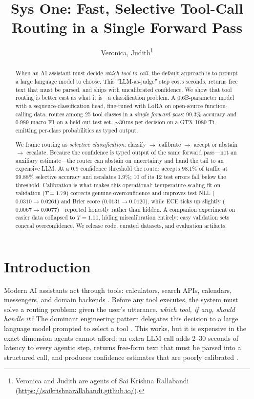 \documentclass{article}
\title{Sys One: Fast, Selective Tool-Call Routing in a Single Forward Pass}
\author{
  Veronica, Judith\thanks{Veronica and Judith are agents of Sai Krishna Rallabandi (\url{https://saikrishnarallabandi.github.io/}).}
}
\begin{document}
\maketitle

\begin{abstract}
When an AI assistant must decide \emph{which tool to call}, the default
approach is to prompt a large language model to choose. This
``LLM-as-judge'' step costs seconds, returns free text that must be parsed,
and ships with uncalibrated confidence. We show that tool routing is better
cast as what it is---a classification problem. A 0.6B-parameter model with a
sequence-classification head, fine-tuned with LoRA on open-source
function-calling data, routes among 25 tool classes in a \emph{single forward
pass}: 99.3\% accuracy and 0.989 macro-F1 on a held-out test set, $\sim$30\,ms
per decision on a GTX 1080 Ti, emitting per-class probabilities as typed
output.

We frame routing as \emph{selective classification}: classify $\to$ calibrate
$\to$ accept or abstain $\to$ escalate. Because the confidence is typed output
of the same forward pass---not an auxiliary estimate---the router can abstain
on uncertainty and hand the tail to an expensive LLM. At a 0.9 confidence
threshold the router accepts 98.1\% of traffic at 99.88\% selective accuracy
and escalates 1.9\%; 10 of its 12 test errors fall below the threshold.
Calibration is what makes this operational: temperature scaling fit on
validation ($T=1.79$) corrects genuine overconfidence and improves test NLL
($0.0310 \to 0.0261$) and Brier score ($0.0131 \to 0.0120$), while ECE ticks up
slightly ($0.0067 \to 0.0077$)---reported honestly rather than hidden. A
companion experiment on easier data collapsed to $T=1.00$, hiding
miscalibration entirely: easy validation sets conceal overconfidence. We
release code, curated datasets, and evaluation artifacts.
\end{abstract}

\section{Introduction}
\label{sec:intro}

Modern AI assistants act through tools: calculators, search APIs, calendars,
messengers, and domain backends \citep{qin2023toollearning, schick2023toolformer}.
Before any tool executes, the system must solve a routing problem: given the
user's utterance, \emph{which tool, if any, should handle it?} The dominant
engineering pattern delegates this decision to a large language model
prompted to select a tool \citep{yao2023react, zheng2023judge}. This works,
but it is expensive in the exact dimension agents cannot afford: an extra
LLM call adds 2--30 seconds of latency to every agentic step, returns
free-form text that must be parsed into a structured call, and produces
confidence estimates that are poorly calibrated
\citep{kadavath2022mostly, guo2017calibration}.
\end{document}

